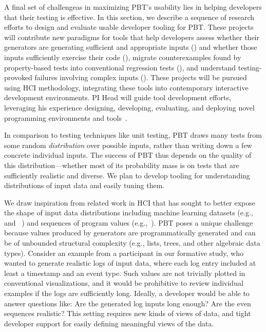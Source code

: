 
A final set of challengeas in maximizing PBT's usability lies in
helping developers
 that their testing is effective. In this section, we
describe a sequence of research efforts to design and evaluate usable developer
tooling for PBT. These projects will contribute new paradigms for tools that
help developers assess whether their generators are generating sufficient and
appropriate inputs () and whether those
inputs sufficiently exercise their code (), migrate
counterexamples found by property-based tests into conventional regression tests (),
and understand testing-provoked failures involving complex inputs
(). These projects will be pursued using HCI
methodology, integrating these tools into contemporary interactive development
environments. PI Head will guide tool development efforts, leveraging his
experience designing, developing, evaluating, and deploying novel programming
environments and tools~\cite{ref:head2015tutorons,ref:suzuki2017tracediff,ref:head2017writing,ref:head2018when,ref:head2018interactive,ref:head2019managing,ref:head2020composing}.

%
In comparison to testing techniques like unit testing, PBT draws many
tests from some
random {\em distribution} over possible inputs, rather than writing down a few
concrete individual inputs. The success  of
PBT thus depends on the quality of this distribution---whether
most of its probability mass is on tests that are sufficiently
realistic and diverse. We plan
to develop tooling for
understanding distributions of input data and easily tuning them.

We draw inspiration from related work in HCI that has sought to better expose
the shape of input data distributions including
machine learning datasets
(e.g.,~\cite{ref:hohman2019gamut} and
~\cite{ref:hohman2020understanding}) and sequences of program values
(e.g.,~\cite{ref:kang2017omnicode}).
PBT poses a unique challenge because values produced by generators are
programmatically generated and
can be of unbounded structural
complexity (e.g., lists, trees, and other algebraic data types).
Consider an
example from a participant in our formative study, who wanted to generate
realistic logs of input data, where each log entry included at least a timestamp
and an event type. Such values are not trivially plotted in conventional
visualizations, and it would be prohibitive to review individual examples if the
logs are sufficiently long. Ideally, a developer would be able to answer
questions like: Are the generated log inputs long enough? Are the even sequences
realistic? This setting requires new kinds of views of data, and tight
developer support for easily defining meaningful views of the data.

